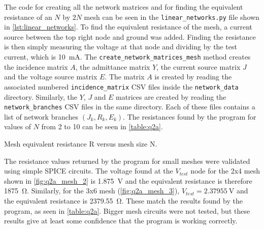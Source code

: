 \documentclass[a4paper,titlepage]{article}
\begin{document}
	The code for creating all the network matrices and for finding the equivalent resistance of an $N$ by $2N$ mesh can be seen in the \texttt{linear_networks.py} file shown in \autoref{lst:linear_networks}. To find the equivalent resistance of the mesh, a current source between the top right node and ground was added. Finding the resistance is then simply measuring the voltage at that node and dividing by the test current, which is \SI{10}{\milli\ampere}. The \texttt{create_network_matrices_mesh} method creates the incidence matrix $A$, the admittance matrix $Y$, the current source matrix $J$ and the voltage source matrix $E$. The matrix $A$ is created by reading the associated numbered \texttt{incidence_matrix} CSV files inside the \texttt{network_data} directory. Similarly, the $Y$, $J$ and $E$ matrices are created by reading the \texttt{network_branches} CSV files in the same directory. Each of these files contains a list of network branches $(J_k, R_k, E_k)$. The resistances found by the program for values of $N$ from 2 to 10 can be seen in \autoref{table:q2a}.
	
	\begin{table}[!htb]
		\centering
		\caption{Mesh equivalent resistance R versus mesh size N.}
		\label{table:q2a}
	\end{table}

	The resistance values returned by the program for small meshes were validated using simple SPICE circuits. The voltage found at the $V_{test}$ node for the 2x4 mesh shown in \autoref{fig:q2a_mesh_2} is \SI{1.875}{\volt} and the equivalent resistance is therefore \SI{1875}{\ohm}. Similarly, for the 3x6 mesh (\autoref{fig:q2a_mesh_3}), $V_{test} = \SI{2.37955}{\volt}$ and the equivalent resistance is \SI{2379.55}{\ohm}. These match the results found by the program, as seen in \autoref{table:q2a}. Bigger mesh circuits were not tested, but these results give at least some confidence that the program is working correctly.
	
\end{document}

